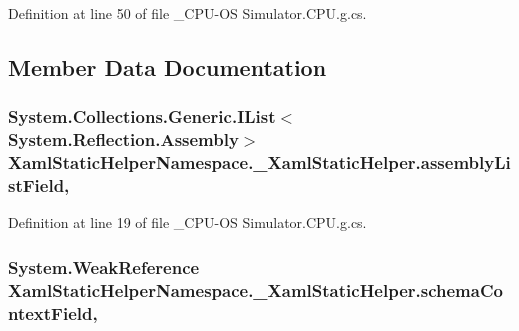 Definition at line 50 of file \+\_\+\+C\+P\+U-\/\+O\+S Simulator.\+C\+P\+U.\+g.\+cs.



\subsection{Member Data Documentation}
\hypertarget{class_xaml_static_helper_namespace_1_1___xaml_static_helper_af8a286a5737de9be9fa52d9a9d957ade}{}
\subsubsection[{assembly\+List\+Field}]{\setlength{\rightskip}{0pt plus 5cm}System.\+Collections.\+Generic.\+I\+List$<$System.\+Reflection.\+Assembly$>$ Xaml\+Static\+Helper\+Namespace.\+\_\+\+Xaml\+Static\+Helper.\+assembly\+List\+Field\hspace{0.3cm}{\ttfamily [static]}, {\ttfamily [private]}}\label{class_xaml_static_helper_namespace_1_1___xaml_static_helper_af8a286a5737de9be9fa52d9a9d957ade}


Definition at line 19 of file \+\_\+\+C\+P\+U-\/\+O\+S Simulator.\+C\+P\+U.\+g.\+cs.

\hypertarget{class_xaml_static_helper_namespace_1_1___xaml_static_helper_a4a6305e6ff660caf4aea99a620f62961}{}
\subsubsection[{schema\+Context\+Field}]{\setlength{\rightskip}{0pt plus 5cm}System.\+Weak\+Reference Xaml\+Static\+Helper\+Namespace.\+\_\+\+Xaml\+Static\+Helper.\+schema\+Context\+Field\hspace{0.3cm}{\ttfamily [static]}, {\ttfamily [private]}}\label{class_xaml_static_helper_namespace_1_1___xaml_static_helper_a4a6305e6ff660caf4aea99a620f62961}



